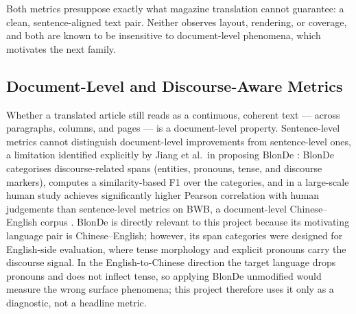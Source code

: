 Both metrics presuppose exactly what magazine translation cannot
guarantee: a clean, sentence-aligned text pair. Neither observes
layout, rendering, or coverage, and both are known to be insensitive to
document-level phenomena, which motivates the next family.

\subsection{Document-Level and Discourse-Aware Metrics}
\label{sec:background-doclevel}

Whether a translated article still reads as a continuous, coherent
text --- across paragraphs, columns, and pages --- is a document-level
property. Sentence-level metrics cannot distinguish document-level
improvements from sentence-level ones, a limitation identified
explicitly by Jiang et al.\ in proposing BlonDe
\cite{jiang2022blonde}: BlonDe categorises discourse-related spans
(entities, pronouns, tense, and discourse markers), computes a
similarity-based F1 over the categories, and in a large-scale human
study achieves significantly higher Pearson correlation with human
judgements than sentence-level metrics on BWB, a document-level
Chinese--English corpus \cite{jiang2022blonde}. BlonDe is directly
relevant to this project because its motivating language pair is
Chinese--English; however, its span categories were designed for
English-side evaluation, where tense morphology and explicit pronouns
carry the discourse signal. In the English-to-Chinese direction the
target language drops pronouns and does not inflect tense, so applying
BlonDe unmodified would measure the wrong surface phenomena; this
project therefore uses it only as a diagnostic, not a headline metric.

